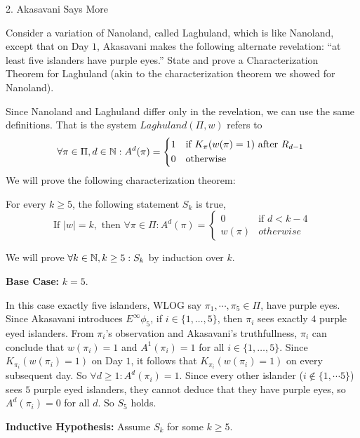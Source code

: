 \documentclass[12pt]{article}
\begin{document}
\begin{problem}{2. Akasavani Says More}

    Consider a variation of Nanoland, called Laghuland, which is like Nanoland, except that on Day $1$, Akasavani makes the following alternate revelation: “at least five islanders have purple eyes.”
    State and prove a Characterization Theorem for Laghuland (akin to the characterization theorem we showed for Nanoland).
\end{problem}


\begin{solution}
    \bbni
    
    Since Nanoland and Laghuland differ only in the revelation, we can use the same definitions. That is the system $Laghuland(\Pi, w)$ refers to 
    \[\forall \pi \in \Pi, d \in \N: A^d(\pi) = \begin{cases*}
        1 & \text{if $K_\pi(w(\pi)=1)$ after $R_{d-1}$} \\ 
        0 & \text{otherwise}
    \end{cases*}\]
    We will prove the following characterization theorem: 
    
    For every $k \geq 5$, the following statement $S_k$ is true, 
    \[\text{If } |w| = k, \text{ then } \forall \pi \in \Pi: A^d(\pi) = \begin{cases*}
        0 & \text{if $d < k - 4$} \\ 
        w(\pi) & otherwise
    \end{cases*}\]

    We will prove $\forall k \in \mathbb N, k \geq 5: S_k$ by induction over $k$. 

    \textbf{Base Case:} $k = 5$. 

    In this case exactly five islanders, WLOG say $\pi_1, \cdots, \pi_5 \in \Pi$, have purple eyes. Since Akasavani introduces $E^\infty \phi_5$, if $i \in \{1, \ldots, 5\}$, then $\pi_i$ sees exactly $4$ purple eyed islanders. From $\pi_i$'s observation and Akasavani's truthfullness, $\pi_i$ can conclude that $w(\pi_i) = 1$ and $A^1(\pi_i) = 1$ for all $i \in \{1, \ldots, 5\}$. Since $K_{\pi_i}(w(\pi_i) = 1)$ on Day $1$, it follows that $K_{\pi_i}(w(\pi_i) = 1)$ on every subsequent day. So $\forall d \geq 1: A^d(\pi_i) = 1$. Since every other islander ($i \notin \{1, \cdots 5\}$) sees $5$ purple eyed islanders, they cannot deduce that they have purple eyes, so $A^d (\pi_i) = 0$ for all $d$. So $S_5$ holds. 

    \textbf{Inductive Hypothesis:} Assume $S_k$ for some $k \geq 5$. 


\end{solution}
\end{document}
